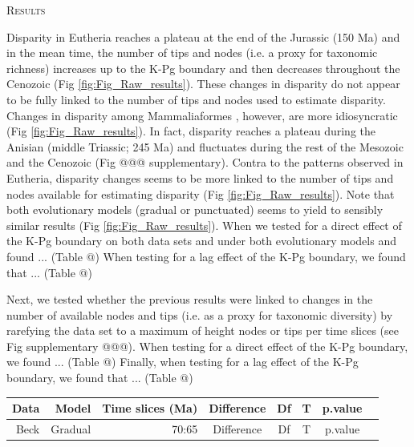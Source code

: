 \documentclass[12pt,letterpaper]{article}
\renewcommand{\section}[1]{%
\bigskip
\begin{center}
\begin{Large}
\normalfont\scshape #1
\medskip
\end{Large}
\end{center}}
\begin{document}
%
%


\section{Results}
Disparity in Eutheria \citep[data from][]{beckancient2014} reaches a plateau at the end of the Jurassic (150 Ma) and in the mean time, the number of tips and nodes (i.e. a proxy for taxonomic richness) increases up to the K-Pg boundary and then decreases throughout the Cenozoic (Fig \ref{fig:Fig_Raw_results}).
These changes in disparity do not appear to be fully linked to the number of tips and nodes used to estimate disparity.
Changes in disparity among Mammaliaformes \citep[data from][]{Slater2012MEE}, however, are more idiosyncratic (Fig \ref{fig:Fig_Raw_results}).
In fact, disparity reaches a plateau during the Anisian (middle Triassic; 245 Ma) and fluctuates during the rest of the Mesozoic and the Cenozoic (Fig @@@ supplementary).
Contra to the patterns observed in Eutheria, disparity changes seems to be more linked to the number of tips and nodes available for estimating disparity (Fig \ref{fig:Fig_Raw_results}).
Note that both evolutionary models (gradual or punctuated) seems to yield to sensibly similar results (Fig \ref{fig:Fig_Raw_results}).
When we tested for a direct effect of the K-Pg boundary on both data sets and under both evolutionary models and found ... (Table @) %
When testing for a lag effect of the K-Pg boundary, we found that ... (Table @) %

Next, we tested whether the previous results were linked to changes in the number of available nodes and tips (i.e. as a proxy for taxonomic diversity) by rarefying the data set to a maximum of height nodes or tips per time slices (see Fig supplementary @@@).
When testing for a direct effect of the K-Pg boundary, we found ... (Table @) %
Finally, when testing for a lag effect of the K-Pg boundary, we found that ... (Table @) %

\begin{table}
\centering
\begin{tabular}{rrr|ccccl}
  \hline
  Data & Model & Time slices (Ma) &  Difference & Df & T & p.value  & \\
  \hline
  Beck & Gradual & 70:65 &  Difference & Df & T & p.value  & \\
   \hline
\end{tabular}
\end{table}
\end{document}
